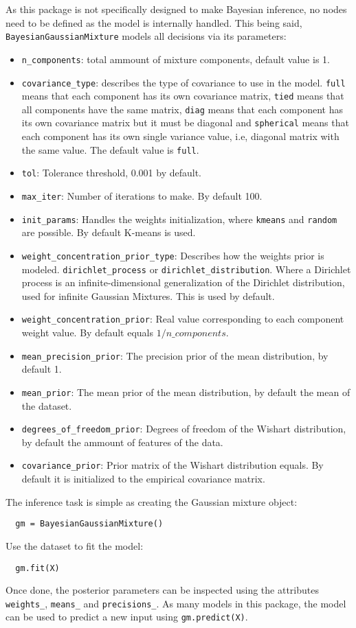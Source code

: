 As this package is not specifically designed to make Bayesian inference, no nodes need to be defined as the model is internally handled. This being said, \texttt{BayesianGaussianMixture} models all decisions via its parameters:
\begin{itemize}
  \item \texttt{n\_components}: total ammount of mixture components, default value is 1.
  \item \texttt{covariance\_type}: describes the type of covariance to use in the model. \texttt{full} means that each component has its own covariance matrix, \texttt{tied} means that all components have the same matrix, \texttt{diag} means that each component has its own covariance matrix but it must be diagonal and \texttt{spherical} means that each component has its own single variance value, i.e, diagonal matrix with the same value. The default value is \texttt{full}.
  \item \texttt{tol}: Tolerance threshold, 0.001 by default.
  \item \texttt{max\_iter}: Number of iterations to make. By default 100.
  \item \texttt{init\_params}: Handles the weights initialization, where \texttt{kmeans} and \texttt{random} are possible. By default K-means is used.
  \item \texttt{weight\_concentration\_prior\_type}: Describes how the weights prior is modeled. \texttt{dirichlet\_process} or \texttt{dirichlet\_distribution}. Where a Dirichlet process is an infinite-dimensional generalization of the Dirichlet distribution, used for infinite Gaussian Mixtures. This is used by default.
  \item \texttt{weight\_concentration\_prior}: Real value corresponding to each component weight value. By default equals \(1/n\_components\).
  \item \texttt{mean\_precision\_prior}: The precision prior of the mean distribution, by default 1.
  \item \texttt{mean\_prior}: The mean prior of the mean distribution, by default the mean of the dataset.
  \item \texttt{degrees\_of\_freedom\_prior}: Degrees of freedom of the Wishart distribution, by default the ammount of features of the data.
  \item \texttt{covariance\_prior}: Prior matrix of the Wishart distribution equals. By default it is initialized to the empirical covariance matrix.
\end{itemize}

The inference task is simple as creating the Gaussian mixture object:
\begin{verbatim}
  gm = BayesianGaussianMixture()
\end{verbatim}
Use the dataset to fit the model:
\begin{verbatim}
  gm.fit(X)
\end{verbatim}

Once done, the posterior parameters can be inspected using the attributes \texttt{weights\_}, \texttt{means\_} and \texttt{precisions\_}. As many models in this package, the model can be used to predict a new input using \texttt{gm.predict(X)}.
